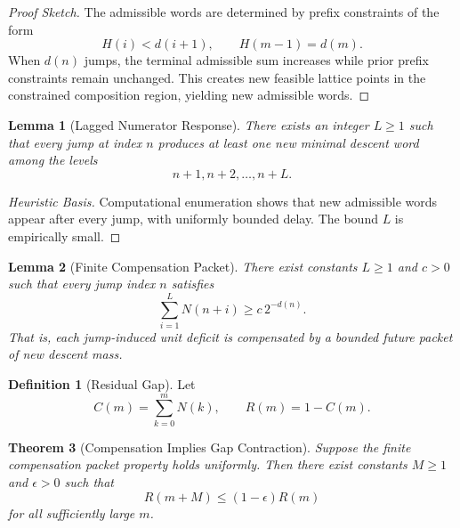 \documentclass[12pt, oneside]{article}
\numberwithin{equation}{section}
\theoremstyle{definition}
\newtheorem{definition}{Definition}[section]
\theoremstyle{plain}
\newtheorem{theorem}{Theorem}[section]
\newtheorem{lemma}[theorem]{Lemma}
\theoremstyle{remark}
\begin{document}
\begin{proof}[Proof Sketch]
The admissible words are determined by prefix constraints of the form
\[
H(i)<d(i+1), \qquad H(m-1)=d(m).
\]
When $d(n)$ jumps, the terminal admissible sum increases while prior
prefix constraints remain unchanged. This creates new feasible lattice
points in the constrained composition region, yielding new admissible
words.
\end{proof}


\begin{lemma}[Lagged Numerator Response]
\label{lem:lagged-response}
There exists an integer $L\ge1$ such that every jump at index $n$
produces at least one new minimal descent word among the levels
\[
n+1,n+2,\dots,n+L.
\]
\end{lemma}

\begin{proof}[Heuristic Basis]
Computational enumeration shows that new admissible words appear after
every jump, with uniformly bounded delay. The bound $L$ is empirically
small.
\end{proof}


\begin{lemma}[Finite Compensation Packet]
\label{lem:packet}
There exist constants $L\ge1$ and $c>0$ such that every jump index $n$
satisfies
\[
\sum_{i=1}^{L} N(n+i)\ge c\,2^{-d(n)}.
\]
That is, each jump-induced unit deficit is compensated by a bounded
future packet of new descent mass.
\end{lemma}


\begin{definition}[Residual Gap]
Let
\[
C(m)=\sum_{k=0}^{m}N(k),
\qquad
R(m)=1-C(m).
\]
\end{definition}


\begin{theorem}[Compensation Implies Gap Contraction]
\label{thm:gap-contraction}
Suppose the finite compensation packet property holds uniformly.
Then there exist constants $M\ge1$ and $\epsilon>0$ such that
\[
R(m+M)\le (1-\epsilon)R(m)
\]
for all sufficiently large $m$.
\end{theorem}
\end{document}
